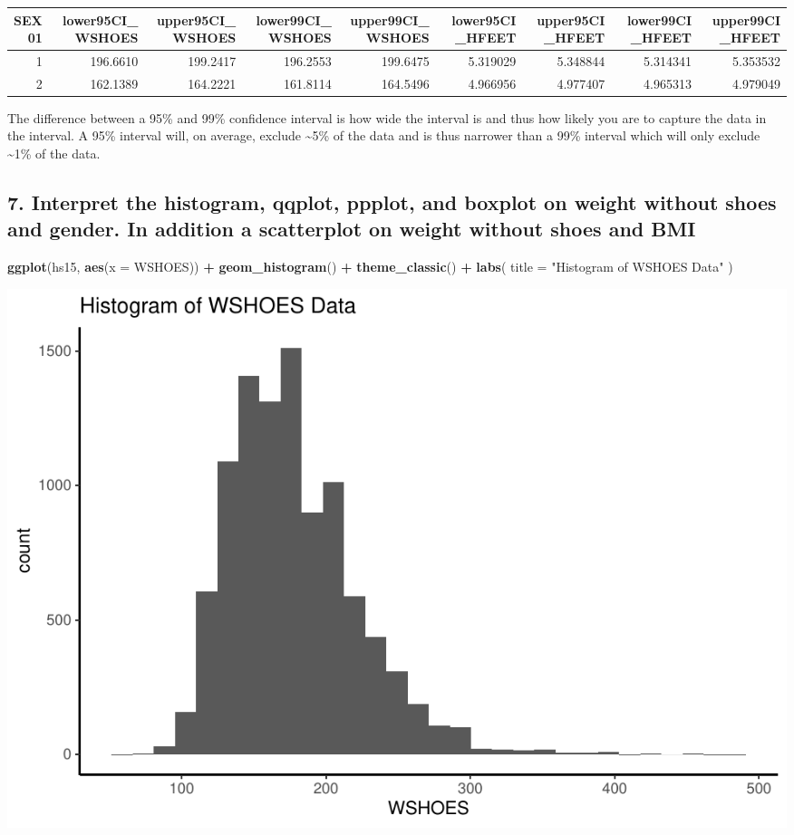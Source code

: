 \documentclass[]{article}
\newenvironment{Shaded}{\begin{snugshade}}{\end{snugshade}}
\newcommand{\DataTypeTok}[1]{\textcolor[rgb]{0.13,0.29,0.53}{#1}}
\newcommand{\KeywordTok}[1]{\textcolor[rgb]{0.13,0.29,0.53}{\textbf{#1}}}
\newcommand{\NormalTok}[1]{#1}
\newcommand{\OperatorTok}[1]{\textcolor[rgb]{0.81,0.36,0.00}{\textbf{#1}}}
\newcommand{\StringTok}[1]{\textcolor[rgb]{0.31,0.60,0.02}{#1}}
\begin{document}
\captionsetup[table]{labelformat=empty,skip=1pt}
\begin{longtable}{rrrrrrrrr}
\toprule
SEX01 & lower95CI\_WSHOES & upper95CI\_WSHOES & lower99CI\_WSHOES & upper99CI\_WSHOES & lower95CI\_HFEET & upper95CI\_HFEET & lower99CI\_HFEET & upper99CI\_HFEET \\ 
\midrule
1 & 196.6610 & 199.2417 & 196.2553 & 199.6475 & 5.319029 & 5.348844 & 5.314341 & 5.353532 \\ 
2 & 162.1389 & 164.2221 & 161.8114 & 164.5496 & 4.966956 & 4.977407 & 4.965313 & 4.979049 \\ 
\bottomrule
\end{longtable}

The difference between a 95\% and 99\% confidence interval is how wide
the interval is and thus how likely you are to capture the data in the
interval. A 95\% interval will, on average, exclude \textasciitilde5\%
of the data and is thus narrower than a 99\% interval which will only
exclude \textasciitilde1\% of the data.

\hypertarget{interpret-the-histogram-qqplot-ppplot-and-boxplot-on-weight-without-shoes-and-gender.-in-addition-a-scatterplot-on-weight-without-shoes-and-bmi}{%
\subsection{7. Interpret the histogram, qqplot, ppplot, and boxplot on
weight without shoes and gender. In addition a scatterplot on weight
without shoes and
BMI}\label{interpret-the-histogram-qqplot-ppplot-and-boxplot-on-weight-without-shoes-and-gender.-in-addition-a-scatterplot-on-weight-without-shoes-and-bmi}}

\begin{Shaded}
\begin{Highlighting}[]
\KeywordTok{ggplot}\NormalTok{(hs15, }\KeywordTok{aes}\NormalTok{(}\DataTypeTok{x =}\NormalTok{ WSHOES)) }\OperatorTok{+}
\StringTok{  }\KeywordTok{geom_histogram}\NormalTok{() }\OperatorTok{+}
\StringTok{  }\KeywordTok{theme_classic}\NormalTok{() }\OperatorTok{+}
\StringTok{  }\KeywordTok{labs}\NormalTok{(}
    \DataTypeTok{title =} \StringTok{"Histogram of WSHOES Data"}
\NormalTok{  )}
\end{Highlighting}
\end{Shaded}

\includegraphics{assignment2_files/figure-latex/q7-1.pdf}
\end{document}

